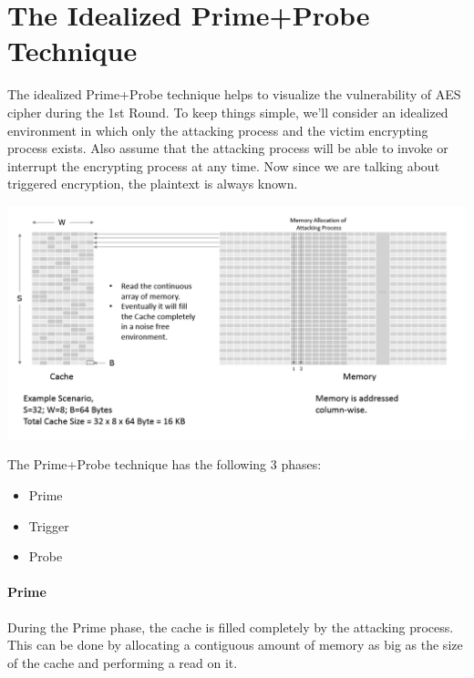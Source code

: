 \section{The Idealized Prime+Probe Technique}

The idealized Prime+Probe technique helps to visualize the vulnerability of AES cipher during the 1st Round. To keep things simple, we'll consider an idealized environment in which only the attacking process and the victim encrypting process exists. Also assume that the attacking process will be able to invoke or interrupt the encrypting process at any time. Now since we are talking about triggered encryption, the plaintext is always known.

\begin{center}
\includegraphics[scale=0.4,natwidth=1159,natheight=589]{psd/filling(new).png}
\end{center}

\begin{flushleft}
The Prime+Probe technique has the following 3 phases:
\end{flushleft}

\begin{itemize}
\item Prime
\item Trigger
\item Probe
\end{itemize}

\paragraph{Prime}
During the Prime phase, the cache is filled completely by the attacking process. This can be done by allocating a contiguous amount of memory as big as the size of the cache and performing a read on it.

